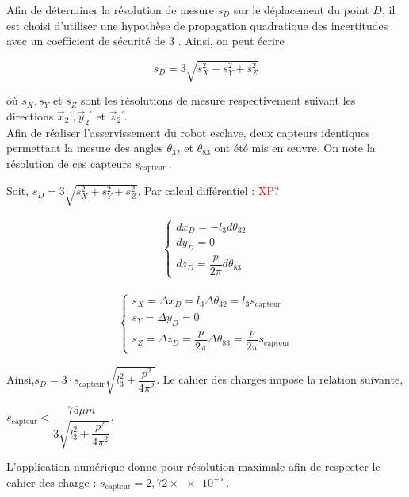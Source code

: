 \ifprof
\else
Afin de déterminer la résolution de mesure $s_{D}$ sur le déplacement du point $D$, il est choisi d'utiliser une hypothèse de propagation quadratique des incertitudes avec un coefficient de sécurité de 3 . Ainsi, on peut écrire

$$
s_{D}=3 \sqrt{s_{X}^{2}+s_{Y}^{2}+s_{Z}^{2}}
$$

où $s_{X}, s_{Y}$ et $s_{Z}$ sont les résolutions de mesure respectivement suivant les directions $\vec{x}_{2}{ }^{\prime}, \vec{y}_{2}{ }^{\prime}$ et $\vec{z}_{2}{ }^{\prime}$.\\
Afin de réaliser l'asservissement du robot esclave, deux capteurs identiques permettant la mesure des angles $\theta_{32}$ et $\theta_{83}$ ont été mis en œuvre. On note la résolution de ces capteurs $s_{\text {capteur }}$.\\
\fi

\ifprof
\begin{corrige}
Soit, $s_D=3\sqrt{s_X^2+s_Y^2+s_Z^2}$. Par calcul différentiel :  \textcolor{red}{XP?}

\begin{minipage}{0.5\textwidth}
\begin{align*}
\left\{
\begin{array}{c}
dx_D=-l_3d\theta_{32}\\
dy_D=0\\
dz_D=\dfrac{p}{2\pi}d\theta_{83}
\end{array}
\right.
\end{align*}
\end{minipage}
\begin{minipage}{0.5\textwidth}

\begin{align*}
\left\{
\begin{array}{c}
s_X=\Delta x_D=l_3\Delta \theta_{32}=l_3 s_{\text{capteur}}\\
s_Y=\Delta y_D=0\\
s_Z=\Delta z_D=\dfrac{p}{2\pi}\Delta \theta_{83}=\dfrac{p}{2\pi}s_{\text{capteur}}
\end{array}
\right.
\end{align*}
\end{minipage}

Ainsi,$
s_D=3\cdot s_{\text{capteur}}\sqrt{l_3^2+\dfrac{p^2}{4\pi^2}}
$.
Le cahier des charges impose la relation suivante,

$
s_{\text{capteur}}<\dfrac{75\mu m}{3\sqrt{l_3^2+\dfrac{p^2}{4\pi^2}}}
$.

L'application numérique donne pour résolution maximale afin de respecter le cahier des charge :  $s_{\text{capteur}}=2,72\times \SI{e-5}{}$.
\end{corrige}
\else
\fi


